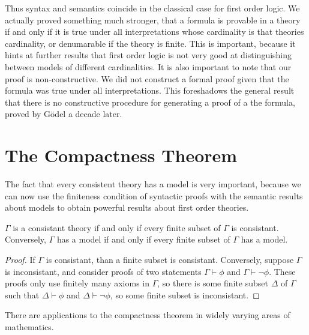 Thus syntax and semantics coincide in the classical case for first order logic. We actually proved something much stronger, that a formula is provable in a theory if and only if it is true under all interpretations whose cardinality is that theories cardinality, or denumarable if the theory is finite. This is important, because it hints at further results that first order logic is not very good at distinguishing between models of different cardinalities. It is also important to note that our proof is non-constructive. We did not construct a formal proof given that the formula was true under all interpretations. This foreshadows the general result that there is no constructive procedure for generating a proof of a the formula, proved by G\"{o}del a decade later.

\section{The Compactness Theorem}

The fact that every consistent theory has a model is very important, because we can now use the finiteness condition of syntactic proofs with the semantic results about models to obtain powerful results about first order theories.

\begin{theorem}
    $\Gamma$ is a consistant theory if and only if every finite subset of $\Gamma$ is consistant. Conversely, $\Gamma$ has a model if and only if every finite subset of $\Gamma$ has a model.
\end{theorem}
\begin{proof}
    If $\Gamma$ is consistant, than a finite subset is consistant. Conversely, suppose $\Gamma$ is inconsistant, and consider proofs of two statements $\Gamma \vdash \phi$ and $\Gamma \vdash \neg \phi$. These proofs only use finitely many axioms in $\Gamma$, so there is some finite subset $\Delta$ of $\Gamma$ such that $\Delta \vdash \phi$ and $\Delta \vdash \neg \phi$, so some finite subset is inconsistant.
\end{proof}

There are applications to the compactness theorem in widely varying areas of mathematics.

